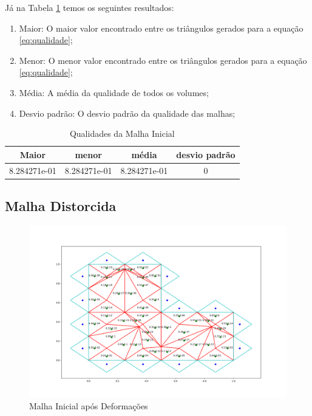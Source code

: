 Já na Tabela \ref{tab:qualidades-malha-inicial} temos os seguintes resultados:

\begin{enumerate}
    \item Maior: O maior valor encontrado entre os triângulos gerados para a equação \ref{eq:qualidade};
    \item Menor: O menor valor encontrado entre os triângulos gerados para a equação \ref{eq:qualidade};
    \item Média: A média da qualidade de todos os volumes;
    \item Desvio padrão: O desvio padrão da qualidade das malhas;
\end{enumerate}

\begin{table}[h!]
 \centering
 \par\caption{Qualidades da Malha Inicial}
\begin{tabular}{c|c|c|c}
 Maior&menor&média&desvio padrão\\\hline\hline
 8.284271e-01&8.284271e-01&8.284271e-01&0\\\hline
 \end{tabular}
 \label{tab:qualidades-malha-inicial}
\end{table}

\newpage
\subsection{Malha Distorcida}

\begin{figure}[ht]
    \centering
    \includegraphics[width=1\linewidth]{fig/malha-ruim.png}
    \caption{Malha Inicial após Deformações}
    \label{fig:malha-ruim}
\end{figure}

